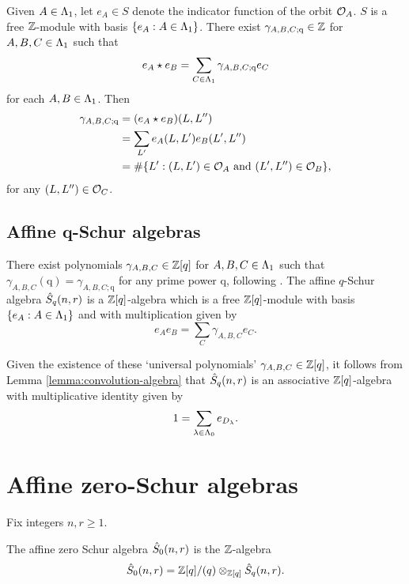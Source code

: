 \documentclass[a4paper, 11pt]{report}
\begin{document}
Given $A\in\Lambda_1{}$, let $e_A\in S$ denote the indicator function of the orbit $\mathcal{O}_{A}$. $S$ is a free $\mathbb{Z}$-module with basis $\{e_A:A\in\Lambda_1{}\}$. There exist $\gamma_{A,B,C;\mathrm{q}}\in\mathbb{Z}$ for $A,B,C\in\Lambda_1{}$ such that
\begin{equation*}
e_A\star e_B = \sum_{C\in\Lambda_1{}} \gamma_{A,B,C;\mathrm{q}}e_C
\end{equation*}
for each $A,B\in\Lambda_1{}$. Then
\begin{align*}
\gamma_{A,B,C;\mathrm{q}}
&=(e_A\star e_B)(L,L'')\\
&= \sum_{L'} e_A(L,L')e_B(L',L'')\\
&= \#\{L':(L,L')\in\mathcal{O}_{A} \text{ and }(L',L'')\in\mathcal{O}_{B}\},
\end{align*}
for any $(L,L'')\in\mathcal{O}_{C}$.

\subsection{Affine q-Schur algebras}

There exist polynomials $\gamma_{A,B,C}\in\mathbb{Z}[q]$ for $A,B,C\in\Lambda_1{}$ such that $\gamma_{A,B,C}(\mathrm{q}) = \gamma_{A,B,C;\mathrm{q}}$ for any prime power $\mathrm{q}$, following \cite[section 4]{lusztig99}. The affine $q$-Schur algebra $\hat{S}_q(n,r)$ is a $\mathbb{Z}[q]$-algebra which is a free $\mathbb{Z}[q]$-module with basis $\{e_A:A\in\Lambda_1{}\}$ and with multiplication given by
\begin{equation*}
e_A e_B = \sum_{C} \gamma_{A,B,C}e_C.
\end{equation*}

Given the existence of these `universal polynomials' $\gamma_{A,B,C}\in\mathbb{Z}[q]$, it follows from Lemma \ref{lemma:convolution-algebra} that $\hat{S}_q(n,r)$ is an associative $\mathbb{Z}[q]$-algebra with multiplicative identity given by
\begin{equation*}
1 = \sum_{\lambda\in\Lambda_0{}} e_{D_{\lambda}}.
\end{equation*}


\section{Affine zero-Schur algebras}

Fix integers $n,r\geq 1$.

\begin{definition}\label{definition:affine0schur}
The affine zero Schur algebra $\hat{S}_0(n,r)$ is the $\mathbb{Z}$-algebra
\begin{equation*}
\hat{S}_0(n,r) = \mathbb{Z}[q]/{(q)}\otimes_{\mathbb{Z}[q]}\hat{S}_q(n,r).
\end{equation*}
\end{definition}
\end{document}
